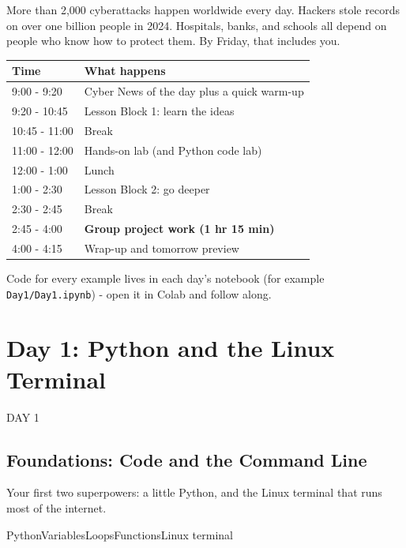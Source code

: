 \documentclass[12pt,openany]{book}
\begin{document}
More than 2,000 cyberattacks happen worldwide every day. Hackers stole records on over one billion people in 2024. Hospitals, banks, and schools all depend on people who know how to protect them. By Friday, that includes you.





\begin{center}\small\begin{tabular}{p{6.5cm}p{6.5cm}}\toprule
\textbf{Time} & \textbf{What happens} \\ \midrule
9:00 - 9:20 & Cyber News of the day plus a quick warm-up \\
9:20 - 10:45 & Lesson Block 1: learn the ideas \\
10:45 - 11:00 & Break \\
11:00 - 12:00 & Hands-on lab (and Python code lab) \\
12:00 - 1:00 & Lunch \\
1:00 - 2:30 & Lesson Block 2: go deeper \\
2:30 - 2:45 & Break \\
2:45 - 4:00 & \textbf{Group project work (1 hr 15 min)} \\
4:00 - 4:15 & Wrap-up and tomorrow preview \\
\bottomrule\end{tabular}\end{center}



Code for every example lives in each day's notebook (for example \texttt{Day1/Day1.ipynb}) - open it in Colab and follow along.



\chapter{Day 1: Python and the Linux Terminal}
DAY 1


\section*{Foundations: Code and the Command Line}


Your first two superpowers: a little Python, and the Linux terminal that runs most of the internet.


PythonVariablesLoopsFunctionsLinux terminal
\end{document}
